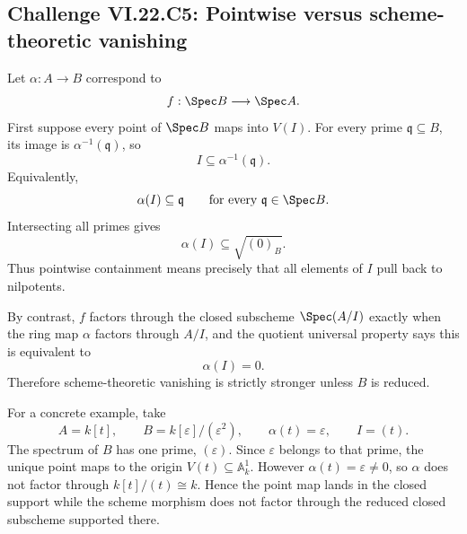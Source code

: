 \subsection*{Challenge VI.22.C5: Pointwise versus scheme-theoretic vanishing}
\begin{solution}
Let $\alpha:A\to B$ correspond to
\[
 f:\Spec B\longrightarrow\Spec A.
\]
First suppose every point of $\Spec B$ maps into $V(I)$.  For every prime
$\mathfrak q\subseteq B$, its image is $\alpha^{-1}(\mathfrak q)$, so
\[
 I\subseteq\alpha^{-1}(\mathfrak q).
\]
Equivalently,
\[
 \alpha(I)\subseteq\mathfrak q
 \qquad\text{for every }\mathfrak q\in\Spec B.
\]
Intersecting all primes gives
\[
 \alpha(I)\subseteq\sqrt{(0)_B}.
\]
Thus pointwise containment means precisely that all elements of $I$ pull back to nilpotents.

By contrast, $f$ factors through the closed subscheme $\Spec(A/I)$ exactly when the ring map
$\alpha$ factors through $A/I$, and the quotient universal property says this is equivalent to
\[
 \alpha(I)=0.
\]
Therefore scheme-theoretic vanishing is strictly stronger unless $B$ is reduced.

For a concrete example, take
\[
 A=k[t],
 \qquad
 B=k[\varepsilon]/(\varepsilon^2),
 \qquad
 \alpha(t)=\varepsilon,
 \qquad
 I=(t).
\]
The spectrum of $B$ has one prime, $(\varepsilon)$.  Since $\varepsilon$ belongs to that prime,
the unique point maps to the origin $V(t)\subseteq\mathbb A^1_k$.  However
$\alpha(t)=\varepsilon\neq0$, so $\alpha$ does not factor through
$k[t]/(t)\cong k$.  Hence the point map lands in the closed support while the scheme morphism
does not factor through the reduced closed subscheme supported there.
\end{solution}
